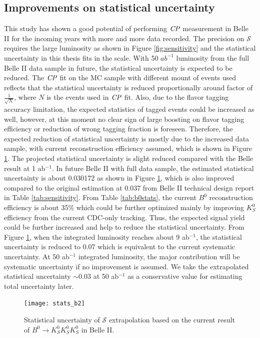 \subsection{Improvements on statistical uncertainty}
This study has shown a good potential of performing $\it{CP}$ measurement in Belle II for the incoming years with more and more data recorded. The precision on $\mathcal{S}$ requires the large luminosity as shown in Figure \ref{fig:sensitivity} and the statistical uncertainty in this thesis fits in the scale. With 50 $ab^{-1}$ luminosity from the full Belle II data sample in future, the statistical uncertainty is expected to be reduced. The $\it{CP}$ fit on the MC sample with different mount of events used reflects that the statistical uncertainty is reduced proportionally around factor of $\frac{1}{\sqrt{N}}$, where $N$ is the events used in $\it{CP}$ fit. Also, due to the flavor tagging accuracy limitation, the expected statistics of tagged events could be increased as well, however, at this moment no clear sign of large boosting on flavor tagging efficiency or reduction of wrong tagging fraction is foreseen. Therefore, the expected reduction of statistical uncertainty is mostly due to the increased data sample, with current reconstruction efficiency assumed, which is shown in Figure \ref{fig:stats_future}. The projected statistical uncertainty is slight reduced compared with the Belle result at 1 ab$^{-1}$. In future Belle II with full data sample, the estimated statistical uncertainty is about 0.030172 as shown in Figure \ref{fig:stats_future}, which is also improved compared to the original estimation at 0.037 from Belle II technical design report in Table \ref{tab:sensitivity}. From Table \ref{tab:b0stats}, the current $B^0$ reconstruction efficiency is about 35\% which could be further optimized mainly by improving $K_S^0$ efficiency from the current CDC-only tracking. Thus, the expected signal yield could be further increased and help to reduce the statistical uncertainty. From Figure \ref{fig:stats_future}, when the integrated luminosity reaches about 9 ab$^{-1}$, the statistical uncertainty is reduced to 0.07 which is equivalent to the current systematic uncertainty. At 50 ab$^{-1}$ integrated luminosity, the major contribution will be systematic uncertainty if no improvement is assumed. We take the extrapolated statistical uncertainty $\sim 0.03$ at 50 ab$^{-1}$ as a conservative value for estimating total uncertainty later.

\begin{figure}[htpb]
\centering
\texttt{[image: stats\_b2]}
\caption{Statistical uncertainty of $\mathcal{S}$ extrapolation based on the current result of $B^0 \to K_S^0  K_S^0  K_S^0$ in Belle II.}
\label{fig:stats_future}
\end{figure}

